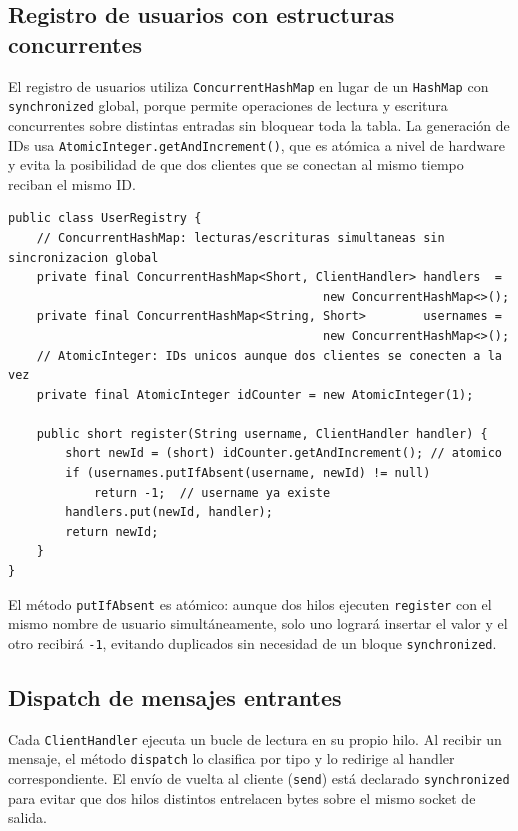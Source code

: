 \documentclass[12pt,a4paper]{article}
\begin{document}
\subsection{Registro de usuarios con estructuras concurrentes}

El registro de usuarios utiliza \texttt{ConcurrentHashMap} en lugar de un
\texttt{HashMap} con \texttt{synchronized} global, porque permite operaciones
de lectura y escritura concurrentes sobre distintas entradas sin bloquear toda
la tabla. La generación de IDs usa \texttt{AtomicInteger.getAndIncrement()},
que es atómica a nivel de hardware y evita la posibilidad de que dos clientes
que se conectan al mismo tiempo reciban el mismo ID.

\begin{lstlisting}[style=java, caption={UserRegistry.java --- ConcurrentHashMap + AtomicInteger}]
public class UserRegistry {
    // ConcurrentHashMap: lecturas/escrituras simultaneas sin sincronizacion global
    private final ConcurrentHashMap<Short, ClientHandler> handlers  =
                                            new ConcurrentHashMap<>();
    private final ConcurrentHashMap<String, Short>        usernames =
                                            new ConcurrentHashMap<>();
    // AtomicInteger: IDs unicos aunque dos clientes se conecten a la vez
    private final AtomicInteger idCounter = new AtomicInteger(1);

    public short register(String username, ClientHandler handler) {
        short newId = (short) idCounter.getAndIncrement(); // atomico
        if (usernames.putIfAbsent(username, newId) != null)
            return -1;  // username ya existe
        handlers.put(newId, handler);
        return newId;
    }
}
\end{lstlisting}

El método \texttt{putIfAbsent} es atómico: aunque dos hilos ejecuten
\texttt{register} con el mismo nombre de usuario simultáneamente, solo uno
logrará insertar el valor y el otro recibirá \texttt{-1}, evitando duplicados
sin necesidad de un bloque \texttt{synchronized}.

\subsection{Dispatch de mensajes entrantes}

Cada \texttt{ClientHandler} ejecuta un bucle de lectura en su propio hilo.
Al recibir un mensaje, el método \texttt{dispatch} lo clasifica por tipo y
lo redirige al handler correspondiente. El envío de vuelta al cliente
(\texttt{send}) está declarado \texttt{synchronized} para evitar que dos
hilos distintos entrelacen bytes sobre el mismo socket de salida.
\end{document}
